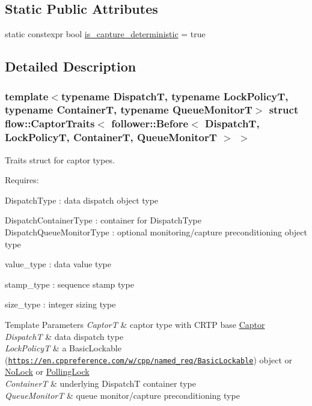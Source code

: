 \subsection*{Static Public Attributes}
\begin{DoxyCompactItemize}
\item 
static constexpr bool \hyperlink{structflow_1_1_captor_traits_3_01follower_1_1_before_3_01_dispatch_t_00_01_lock_policy_t_00_01_c62c65191d3908e10afd70708af893571_a84e9d853507aea739c13eef4367500cc}{is\+\_\+capture\+\_\+deterministic} = true
\end{DoxyCompactItemize}


\subsection{Detailed Description}
\subsubsection*{template$<$typename DispatchT, typename Lock\+PolicyT, typename ContainerT, typename Queue\+MonitorT$>$\newline
struct flow\+::\+Captor\+Traits$<$ follower\+::\+Before$<$ Dispatch\+T, Lock\+Policy\+T, Container\+T, Queue\+Monitor\+T $>$ $>$}

Traits struct for captor types. 

Requires\+:
\begin{DoxyItemize}
\item {\ttfamily Dispatch\+Type} \+: data dispatch object type
\item {\ttfamily Dispatch\+Container\+Type} \+: container for {\ttfamily Dispatch\+Type} {\ttfamily Dispatch\+Queue\+Monitor\+Type} \+: optional monitoring/capture preconditioning object type
\item {\ttfamily value\+\_\+type} \+: data value type
\item {\ttfamily stamp\+\_\+type} \+: sequence stamp type
\item {\ttfamily size\+\_\+type} \+: integer sizing type
\end{DoxyItemize}


\begin{DoxyTemplParams}{Template Parameters}
{\em CaptorT} & captor type with C\+R\+TP base {\ttfamily \hyperlink{classflow_1_1_captor}{Captor}}\\
\hline
{\em DispatchT} & data dispatch type \\
\hline
{\em Lock\+PolicyT} & a Basic\+Lockable (\href{https://en.cppreference.com/w/cpp/named_req/BasicLockable}{\tt https\+://en.\+cppreference.\+com/w/cpp/named\+\_\+req/\+Basic\+Lockable}) object or \hyperlink{structflow_1_1_no_lock}{No\+Lock} or \hyperlink{structflow_1_1_polling_lock}{Polling\+Lock} \\
\hline
{\em ContainerT} & underlying {\ttfamily DispatchT} container type \\
\hline
{\em Queue\+MonitorT} & queue monitor/capture preconditioning type \\
\hline
\end{DoxyTemplParams}


